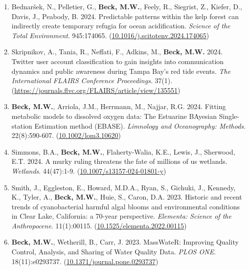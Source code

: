 \documentclass[letterpaper,12pt]{article}
\begin{document}
\begin{enumerate}
\item Bednar\v{s}ek, N., Pelletier, G., \textbf{Beck, M.W.}, Feely, R., Siegrist, Z., Kiefer, D., Davis, J., Peabody, B. 2024. Predictable patterns within the kelp forest can indirectly create temporary refugia for ocean acidification. \textit{Science of the Total Environment}. 945:174065. ({\footnotesize\href{https://doi.org/10.1016/j.scitotenv.2024.174065}{10.1016/j.scitotenv.2024.174065}}) 

\item Skripnikov, A., Tania, R., Neffati, F., Adkins, M., \textbf{Beck, M.W.} 2024. Twitter user account classification to gain insights into communication dynamics and public awareness during Tampa Bay's red tide events. \textit{The International FLAIRS Conference Proceedings}. 37(1). ({\footnotesize\href{https://journals.flvc.org/FLAIRS/article/view/135551}{https://journals.flvc.org/FLAIRS/article/view/135551}}) 

\item \textbf{Beck, M.W.}, Arriola, J.M., Herrmann, M., Najjar, R.G. 2024. Fitting metabolic models to dissolved oxygen data: The Estuarine BAyesian Single-station Estimation method (EBASE). \textit{Limnology and Oceanography: Methods}. 22(8):590-607. ({\footnotesize\href{https://doi.org/10.1002/lom3.10620}{10.1002/lom3.10620}})

\item Simmons, B.A., \textbf{Beck, M.W.}, Flaherty-Walia, K.E., Lewis, J., Sherwood, E.T. 2024. A murky ruling threatens the fate of millions of us wetlands. \textit{Wetlands}. 44(47):1-9. ({\footnotesize\href{https://doi.org/10.1007/s13157-024-01801-y}{10.1007/s13157-024-01801-y}})

\item Smith, J., Eggleston, E., Howard, M.D.A., Ryan, S., Gichuki, J., Kennedy, K., Tyler, A., \textbf{Beck, M.W.}, Huie, S., Caron, D.A. 2023. Historic and recent trends of cyanobacterial harmful algal blooms and environmental conditions in Clear Lake, California: a 70-year perspective. \textit{Elementa: Science of the Anthropocene}. 11(1):00115. ({\footnotesize\href{https://doi.org/10.1525/elementa.2022.00115}{10.1525/elementa.2022.00115}})

\item \textbf{Beck, M.W.}, Wetherill, B., Carr, J. 2023. MassWateR: Improving Quality Control, Analysis, and Sharing of Water Quality Data. \textit{PLOS ONE}. 18(11):e0293737. ({\footnotesize\href{https://doi.org/10.1371/journal.pone.0293737}{10.1371/journal.pone.0293737}})


\end{enumerate}
\end{document}
